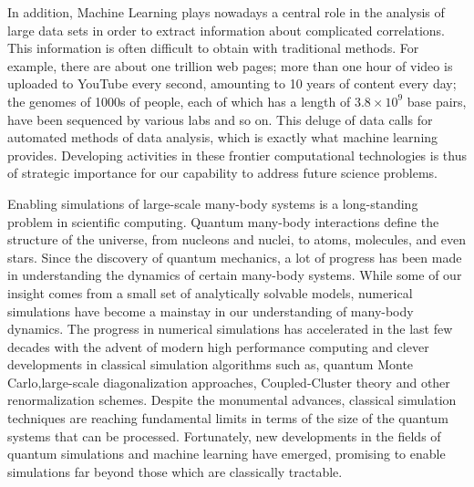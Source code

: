 \documentclass[twoside,english]{uiofysmaster}
\begin{document}
In addition, Machine Learning plays nowadays a central role
in the analysis of large data sets in order to extract information
about complicated correlations. This information is often difficult to
obtain with traditional methods. For example, there are about one
trillion web pages; more than one hour of video is uploaded to YouTube
every second, amounting to 10 years of content every day; the genomes
of 1000s of people, each of which has a length of $3.8\times 10^9$
base pairs, have been sequenced by various labs and so on. This deluge
of data calls for automated methods of data analysis, which is exactly
what machine learning provides.  Developing activities in these
frontier computational technologies is thus of strategic importance
for our capability to address future science problems.


Enabling simulations of large-scale many-body systems is a
long-standing problem in scientific computing.  Quantum many-body
interactions define the structure of the universe, from nucleons and
nuclei, to atoms, molecules, and even stars. Since the discovery of
quantum mechanics, a lot of progress has been made in understanding
the dynamics of certain many-body systems. While some of our insight
comes from a small set of analytically solvable models, numerical
simulations have become a mainstay in our understanding of many-body
dynamics. The progress in numerical simulations has accelerated in the
last few decades with the advent of modern high performance computing
 and clever developments in classical simulation algorithms such
as, quantum Monte Carlo,large-scale diagonalization approaches,
Coupled-Cluster theory and other renormalization schemes.  Despite the
monumental advances, classical simulation techniques are reaching
fundamental limits in terms of the size of the quantum systems that
can be processed. Fortunately, new developments in the fields of quantum
simulations and machine learning have emerged, promising to enable simulations far beyond
those which are classically tractable. 
\end{document}
